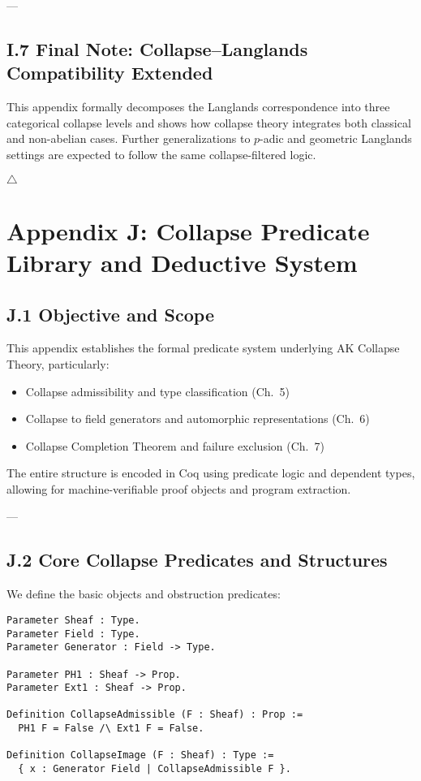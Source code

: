 \documentclass[11pt]{article}
\begin{document}
---

\subsection*{I.7 Final Note: Collapse–Langlands Compatibility Extended}

This appendix formally decomposes the Langlands correspondence into three categorical collapse levels and shows how collapse theory integrates both classical and non-abelian cases.  
Further generalizations to \( p \)-adic and geometric Langlands settings are expected to follow the same collapse-filtered logic.

\hfill $\triangle$



\section*{Appendix J: Collapse Predicate Library and Deductive System}

\subsection*{J.1 Objective and Scope}

This appendix establishes the formal predicate system underlying AK Collapse Theory, particularly:

\begin{itemize}
    \item Collapse admissibility and type classification (Ch.~5)
    \item Collapse to field generators and automorphic representations (Ch.~6)
    \item Collapse Completion Theorem and failure exclusion (Ch.~7)
\end{itemize}

The entire structure is encoded in Coq using predicate logic and dependent types, allowing for machine-verifiable proof objects and program extraction.

---

\subsection*{J.2 Core Collapse Predicates and Structures}

We define the basic objects and obstruction predicates:

\begin{lstlisting}[language=Coq, caption={Coq: Core Types and Predicates}]
Parameter Sheaf : Type.
Parameter Field : Type.
Parameter Generator : Field -> Type.

Parameter PH1 : Sheaf -> Prop.
Parameter Ext1 : Sheaf -> Prop.

Definition CollapseAdmissible (F : Sheaf) : Prop :=
  PH1 F = False /\ Ext1 F = False.

Definition CollapseImage (F : Sheaf) : Type :=
  { x : Generator Field | CollapseAdmissible F }.
\end{lstlisting}
\end{document}
